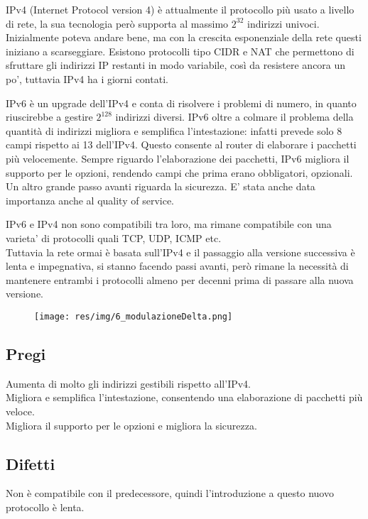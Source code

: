 IPv4 (Internet Protocol version 4) è attualmente il protocollo più usato a livello di rete, la sua tecnologia però supporta al massimo $2^32$ indirizzi univoci.
Inizialmente poteva andare bene, ma con la crescita esponenziale della rete questi iniziano a scarseggiare. Esistono protocolli tipo CIDR e NAT che permettono di sfruttare gli indirizzi IP restanti in modo variabile, così da resistere ancora un po', tuttavia IPv4 ha i giorni contati.

IPv6 è un upgrade dell'IPv4 e conta di risolvere i problemi di numero, in quanto riuscirebbe a gestire $2^128$ indirizzi diversi.
IPv6 oltre a colmare il problema della quantità di indirizzi migliora e semplifica l'intestazione: infatti prevede solo 8 campi rispetto ai 13 dell'IPv4. Questo consente al router di elaborare i pacchetti più velocemente. Sempre riguardo l'elaborazione dei pacchetti, IPv6 migliora il supporto per le opzioni, rendendo campi che prima erano obbligatori, opzionali. Un altro grande passo avanti riguarda la sicurezza. E' stata anche data importanza anche al quality of service.

IPv6 e IPv4 non sono compatibili tra loro, ma rimane compatibile con una varieta' di protocolli quali TCP, UDP, ICMP etc. \\Tuttavia la rete ormai è basata sull'IPv4 e il passaggio alla versione successiva è lenta e impegnativa, si stanno facendo passi avanti, però rimane la necessità di mantenere entrambi i protocolli almeno per decenni prima di passare alla nuova versione.

\begin{figure}[H]
\centering
\texttt{[image: res/img/6\_modulazioneDelta.png]}
\end{figure}

\subsection{Pregi}
Aumenta di molto gli indirizzi gestibili rispetto all'IPv4.\\
Migliora e semplifica l'intestazione, consentendo una elaborazione di pacchetti più veloce.\\
Migliora il supporto per le opzioni e migliora la sicurezza.

\subsection{Difetti}
Non è compatibile con il predecessore, quindi l'introduzione a questo nuovo protocollo è lenta.

